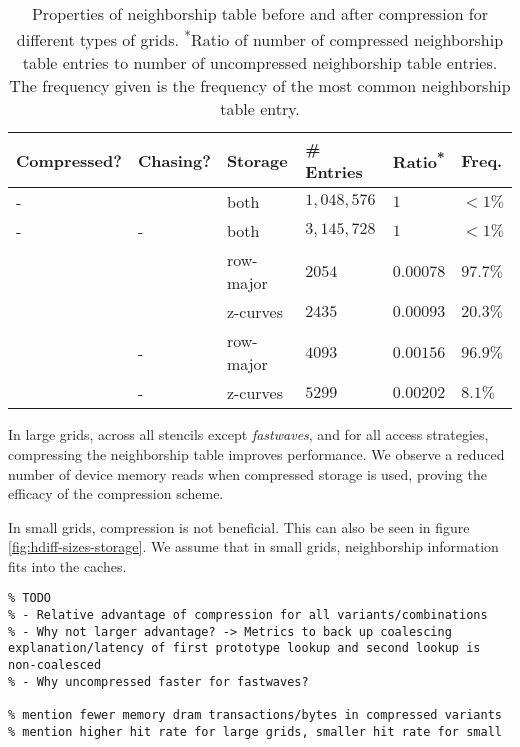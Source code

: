 \begin{table}
	\begin{tabular}{l l l l l l}
		\hline
		Compressed? & Chasing? & Storage & \# Entries & Ratio\textsuperscript{*} & Freq.\textsuperscript{\dag} \\
		\hline
		- & \checkmark & both & $1,048,576$ & $1$ & $<1\%$\\
		- & - & both & $3,145,728$ & $1$ & $<1\%$\\
		\checkmark & \checkmark & row-major & $2054$ & $0.00078$ & $97.7\%$ \\
		\checkmark & \checkmark & z-curves & $2435$ & $0.00093$ & $20.3\%$ \\
		\checkmark & - & row-major & $4093$ & $0.00156$ & $96.9\%$ \\
		\checkmark & - & z-curves & $5299$ & $0.00202$ & $8.1\%$ \\
		\hline
	\end{tabular}
	\caption{\label{tab:compression} Properties of neighborship table before and after compression for different types of grids. \textsuperscript{*}Ratio of number of compressed neighborship table entries to number of uncompressed neighborship table entries. \textsuperscript{\dag}The frequency given is the frequency of the most common neighborship table entry. }
\end{table}

In large grids, across all stencils except \emph{fastwaves}, and for all access strategies, compressing the neighborship table improves performance. We observe a reduced number of device memory reads when compressed storage is used, proving the efficacy of the compression scheme.


In small grids, compression is not beneficial. This can also be seen in figure \ref{fig:hdiff-sizes-storage}. We assume that in small grids, neighborship information fits into the caches. %

\begin{verbatim}
% TODO
% - Relative advantage of compression for all variants/combinations
% - Why not larger advantage? -> Metrics to back up coalescing explanation/latency of first prototype lookup and second lookup is non-coalesced
% - Why uncompressed faster for fastwaves?

% mention fewer memory dram transactions/bytes in compressed variants
% mention higher hit rate for large grids, smaller hit rate for small
\end{verbatim}
